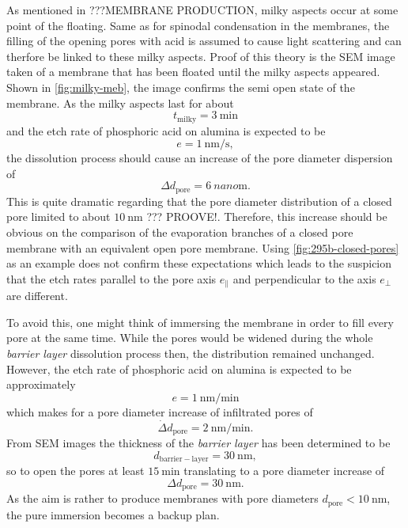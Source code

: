 \documentclass[../thesis.tex]{subfiles}
\begin{document}
        As mentioned in ???MEMBRANE PRODUCTION, milky aspects occur at some point of the floating. Same as for spinodal condensation in the membranes, the filling of the opening pores with acid is assumed to cause light scattering and can therfore be linked to these milky aspects. Proof of this theory is the SEM image taken of a membrane that has been floated until the milky aspects appeared. Shown in \cref{fig:milky-meb}, the image confirms the semi open state of the membrane. As the milky aspects last for about
        \begin{equation*}
          t_\mathrm{milky} =\SI{3}{\minute}
        \end{equation*}
        and the etch rate of phosphoric acid on alumina is expected to be
        \begin{equation*}
          e=\SI{1}{\nano\meter\per\second},
        \end{equation*}
        the  dissolution process should cause an increase of the pore diameter dispersion of
        \begin{equation*}
          \Delta d_\mathrm{pore} = \SI{6}{nano\meter}.
        \end{equation*}
        This is quite dramatic regarding that the pore diameter distribution of a closed pore limited to about $\SI{10}{\nano\meter}$ ??? PROOVE!. Therefore, this increase should be obvious on the comparison of the evaporation branches of a closed pore membrane with an equivalent open pore membrane. Using \cref{fig:295b-closed-pores} as an example does not confirm these expectations which leads to the suspicion that the etch rates parallel to the pore axis $e_\parallel$ and perpendicular to the axis $e_\perp$ are different.


         To avoid this, one might think of immersing the membrane in order to fill every pore at the same time. While the pores would be widened during the whole \textit{barrier layer} dissolution process then, the distribution remained unchanged. However, the etch rate of phosphoric acid on alumina is expected to be approximately
        \begin{equation*}
          e=\SI{1}{\nano\meter\per\minute}
        \end{equation*}
        which makes for a pore diameter increase of infiltrated pores of
        \begin{equation*}
          \dot\Delta d_\mathrm{pore}=\SI{2}{\nano\meter\per\minute}.
        \end{equation*}
        From SEM images the thickness of the \textit{barrier layer} has been determined to be
        \begin{equation*}
          d_\mathrm{barrier-layer}=\SI{30}{\nano\meter},
        \end{equation*}
        so to open the pores at least $\SI{15}{\minute}$ translating to a pore diameter increase of
        \begin{equation*}
          \Delta d_\mathrm{pore} = \SI{30}{\nano\meter}.
        \end{equation*}
        As the aim is rather to produce membranes with pore diameters $d_\mathrm{pore}<\SI{10}{\nano\meter}$, the pure immersion becomes a backup plan.
\end{document}
